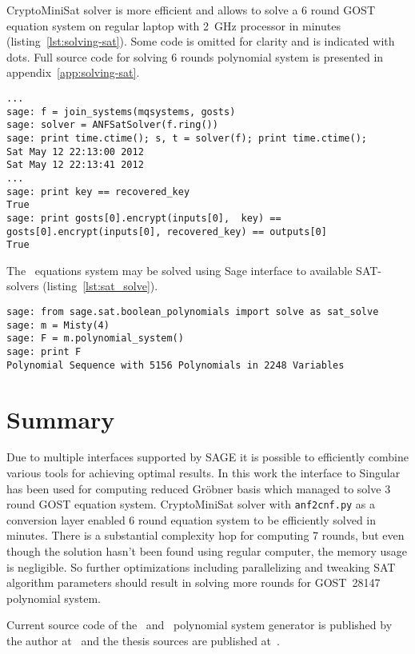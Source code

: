 \mbox{CryptoMiniSat} solver is more efficient and allows to solve a 6 round GOST
equation system on regular laptop with 2~GHz processor in minutes
(listing~\ref{lst:solving-sat}). Some code is omitted for clarity and is
indicated with dots. Full source code for solving 6 rounds polynomial system is
presented in appendix~\ref{app:solving-sat}. 
\begin{lstlisting}[label=lst:solving-sat, caption=Solving 6 round GOST system using SAT solver]
...
sage: f = join_systems(mqsystems, gosts)
sage: solver = ANFSatSolver(f.ring())
sage: print time.ctime(); s, t = solver(f); print time.ctime();
Sat May 12 22:13:00 2012
Sat May 12 22:13:41 2012
...
sage: print key == recovered_key                                                                             
True
sage: print gosts[0].encrypt(inputs[0],  key) == gosts[0].encrypt(inputs[0], recovered_key) == outputs[0]    
True
\end{lstlisting}

The \misty\ equations system may be solved using Sage interface to available
SAT-solvers (listing~\ref{lst:sat_solve}).
\begin{lstlisting}[label=lst:sat_solve, caption=Using Sage SAT interface]
sage: from sage.sat.boolean_polynomials import solve as sat_solve
sage: m = Misty(4)
sage: F = m.polynomial_system()
sage: print F
Polynomial Sequence with 5156 Polynomials in 2248 Variables
\end{lstlisting}

\section{Summary}

Due to multiple interfaces supported by SAGE it is possible to efficiently
combine various tools for achieving optimal results. In this work the interface
to Singular has been used for computing reduced Gr\"obner basis which managed
to solve 3 round GOST equation system.
\mbox{CryptoMiniSat} solver with \verb+anf2cnf.py+ as a conversion layer
enabled 6 round equation system to be efficiently solved in minutes. There is a
substantial complexity hop for computing 7 rounds, but even though the solution
hasn't been found using regular computer, the memory usage is negligible. So
further optimizations including parallelizing and tweaking SAT algorithm
parameters should result in solving more rounds for GOST~28147 polynomial
system.

Current source code of the \gost\ and \misty\  polynomial system generator is
published by the author at~\cite{zoresvit:repo-algebraic} and the thesis sources
are published at~\cite{zoresvit:thesis}.
